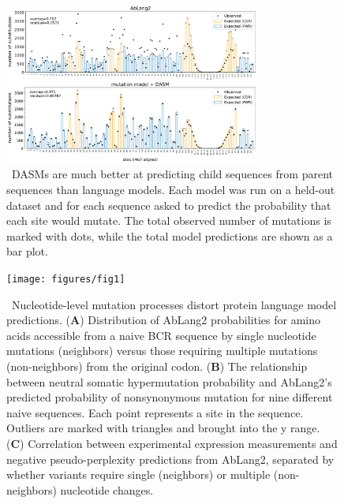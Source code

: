\documentclass{article}
\begin{document}
\begin{figure}[ht]
\centering
\centerline{\includegraphics[width=0.75\textwidth]{figures/sites-oe-rodriguez}}
\caption{\
DASMs are much better at predicting child sequences from parent sequences than language models.
Each model was run on a held-out dataset and for each sequence asked to predict the probability that each site would mutate.
The total observed number of mutations is marked with dots, while the total model predictions are shown as a bar plot.
}%
\label{fig:selFactorsAndPerplexity}
\end{figure}

\begin{figure}[h!]
\centering
\centerline{\texttt{[image: figures/fig1]}}
\caption{\
Nucleotide-level mutation processes distort protein language model predictions.
(\textbf{A}) Distribution of AbLang2 probabilities for amino acids accessible from a naive BCR sequence by single nucleotide mutations (neighbors) versus those requiring multiple mutations (non-neighbors) from the original codon.
(\textbf{B}) The relationship between neutral somatic hypermutation probability and AbLang2's predicted probability of nonsynonymous mutation for nine different naive sequences. Each point represents a site in the sequence.
Outliers are marked with triangles and brought into the y range.
(\textbf{C}) Correlation between experimental expression measurements and negative pseudo-perplexity predictions from AbLang2, separated by whether variants require single (neighbors) or multiple (non-neighbors) nucleotide changes.
}%
\label{fig:ntProcessInLLMs}
\end{figure}
\end{document}
